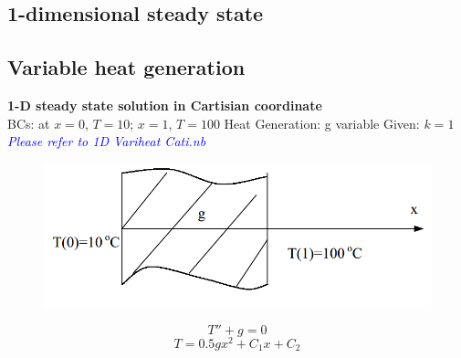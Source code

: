\begin{appendices}



\section{1-dimensional steady state}
\subsection{Variable heat generation}
\begin{example}
\textbf{1-D steady state solution in Cartisian coordinate}\\
BCs: at $x=0$, $T=10$; 
$x=1$, $T=100$ Heat Generation: g variable Given: $k=1$
\textcolor{blue} {\emph{Please refer to 1D Variheat Cati.nb}}
\begin{figure}[H]
  \centering
    \includegraphics[scale=0.5]{figures/appendixA/1}
\end{figure}
$$T''+g=0$$
$$T=0.5gx^2+C_1x+C_2$$
\end{example}


\end{appendices}
